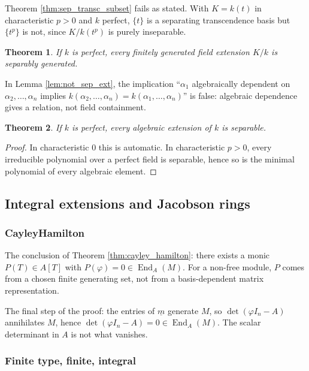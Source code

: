 \documentclass[12pt]{article}
\theoremstyle{plain}
\newtheorem{thm}{Theorem}[subsection] %
\theoremstyle{definition}
\begin{document}
Theorem \ref{thm:sep_transc_subset} fails as stated. With $K=k(t)$ in characteristic $p>0$ and $k$ perfect, $\{t\}$ is a separating transcendence basis but $\{t^p\}$ is not, since $K/k(t^p)$ is purely inseparable.

\begin{thm}
If $k$ is perfect, every finitely generated field extension $K/k$ is separably generated.
\end{thm}

In Lemma \ref{lem:not_sep_ext}, the implication ``$\alpha_1$ algebraically dependent on $\alpha_2,\ldots,\alpha_n$ implies $k(\alpha_2,\ldots,\alpha_n)=k(\alpha_1,\ldots,\alpha_n)$'' is false: algebraic dependence gives a relation, not field containment.

\begin{thm}
If $k$ is perfect, every algebraic extension of $k$ is separable.
\end{thm}
\begin{proof}
In characteristic $0$ this is automatic. In characteristic $p>0$, every irreducible polynomial over a perfect field is separable, hence so is the minimal polynomial of every algebraic element.
\end{proof}

\subsection{Integral extensions and Jacobson rings}

\subsubsection*{Cayley\textendash Hamilton}

The conclusion of Theorem \ref{thm:cayley_hamilton}: there exists a monic $P(T)\in A[T]$ with $P(\varphi)=0\in\operatorname{End}_A(M)$. For a non-free module, $P$ comes from a chosen finite generating set, not from a basis-dependent matrix representation.

The final step of the proof: the entries of $\underline{m}$ generate $M$, so $\det(\varphi I_n-A)$ annihilates $M$, hence $\det(\varphi I_n-A)=0\in\operatorname{End}_A(M)$. The scalar determinant in $A$ is not what vanishes.

\subsubsection*{Finite type, finite, integral}
\end{document}
